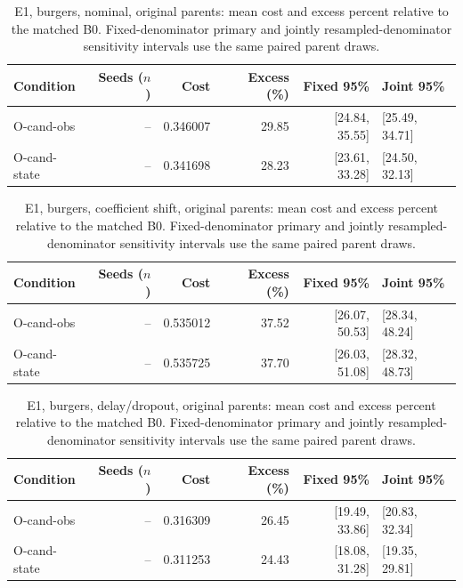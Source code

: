 \begin{table}[ht]
\centering\small
\caption{E1, burgers, nominal, original parents: mean cost and excess percent relative to the matched B0. Fixed-denominator primary and jointly resampled-denominator sensitivity intervals use the same paired parent draws.}\label{tab:revision_cost_E1_burgers_locked_nominal}
\begin{tabular}{@{}lrrrrl@{}}\toprule
Condition & Seeds ($n$) & Cost & Excess (\%) & Fixed 95\% & Joint 95\%\\\midrule
O-cand-obs & -- & 0.346007 & 29.85 & [24.84, 35.55] & [25.49, 34.71]\\
O-cand-state & -- & 0.341698 & 28.23 & [23.61, 33.28] & [24.50, 32.13]\\
\bottomrule\end{tabular}
\end{table}

\begin{table}[ht]
\centering\small
\caption{E1, burgers, coefficient shift, original parents: mean cost and excess percent relative to the matched B0. Fixed-denominator primary and jointly resampled-denominator sensitivity intervals use the same paired parent draws.}\label{tab:revision_cost_E1_burgers_locked_coefficient_ood}
\begin{tabular}{@{}lrrrrl@{}}\toprule
Condition & Seeds ($n$) & Cost & Excess (\%) & Fixed 95\% & Joint 95\%\\\midrule
O-cand-obs & -- & 0.535012 & 37.52 & [26.07, 50.53] & [28.34, 48.24]\\
O-cand-state & -- & 0.535725 & 37.70 & [26.03, 51.08] & [28.32, 48.73]\\
\bottomrule\end{tabular}
\end{table}

\begin{table}[ht]
\centering\small
\caption{E1, burgers, delay/dropout, original parents: mean cost and excess percent relative to the matched B0. Fixed-denominator primary and jointly resampled-denominator sensitivity intervals use the same paired parent draws.}\label{tab:revision_cost_E1_burgers_locked_delay_dropout}
\begin{tabular}{@{}lrrrrl@{}}\toprule
Condition & Seeds ($n$) & Cost & Excess (\%) & Fixed 95\% & Joint 95\%\\\midrule
O-cand-obs & -- & 0.316309 & 26.45 & [19.49, 33.86] & [20.83, 32.34]\\
O-cand-state & -- & 0.311253 & 24.43 & [18.08, 31.28] & [19.35, 29.81]\\
\bottomrule\end{tabular}
\end{table}

